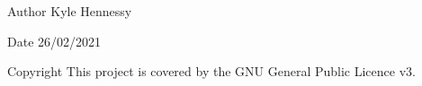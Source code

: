 \begin{DoxyAuthor}{Author}
Kyle Hennessy 
\end{DoxyAuthor}
\begin{DoxyDate}{Date}
26/02/2021 
\end{DoxyDate}
\begin{DoxyCopyright}{Copyright}
This project is covered by the G\+NU General Public Licence v3. 
\end{DoxyCopyright}
